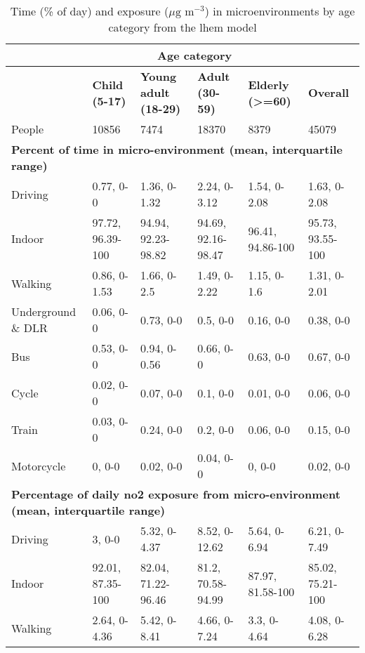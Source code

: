 \thispagestyle{empty}
\begin{landscape}

\begin{table}[H]
\caption{Time (\% of day) and exposure ($\mu \text{g m}^{-3}$) in microenvironments by age category from the \gls{lhem} model}
\centering
    \begin{tabular}{ | p{3.5cm} | p{3.3cm} | p{3.9cm} | p{3.3cm} | p{3.1cm} | p{3.1cm} |}
    \hline 
     & \multicolumn{4}{|c|}{\bfseries{Age category}} & \\ \hline
     & \bfseries{Child} (5-17) & \bfseries{Young adult} (18-29) & \bfseries{Adult (30-59)} & \bfseries{Elderly (\textgreater=60)} & \bfseries{Overall} \\ \hline
     People & 10856 & 7474 & 18370 & 8379 & 45079 \\ \hline
     \multicolumn{6}{|l|}{\bfseries{Percent of time in micro-environment (mean, interquartile range)}} \\ \hline
     Driving & 0.77, 0-0 & 1.36, 0-1.32 & 2.24, 0-3.12 & 1.54, 0-2.08 & 1.63, 0-2.08 \\ \hline
     Indoor & 97.72, 96.39-100 & 94.94, 92.23-98.82 & 94.69, 92.16-98.47 & 96.41, 94.86-100 & 95.73, 93.55-100 \\ \hline
     Walking & 0.86, 0-1.53 & 1.66, 0-2.5 & 1.49, 0-2.22 & 1.15, 0-1.6 & 1.31, 0-2.01 \\ \hline
     Underground \& DLR & 0.06, 0-0 & 0.73, 0-0 & 0.5, 0-0 & 0.16, 0-0 & 0.38, 0-0 \\ \hline
     Bus & 0.53, 0-0 & 0.94, 0-0.56 & 0.66, 0-0 & 0.63, 0-0 & 0.67, 0-0 \\ \hline
     Cycle & 0.02, 0-0 & 0.07, 0-0 & 0.1, 0-0 & 0.01, 0-0 & 0.06, 0-0 \\ \hline
     Train & 0.03, 0-0 & 0.24, 0-0 & 0.2, 0-0 & 0.06, 0-0 & 0.15, 0-0 \\ \hline
     Motorcycle & 0, 0-0 & 0.02, 0-0 & 0.04, 0-0 & 0, 0-0 & 0.02, 0-0 \\ \hline
     \multicolumn{6}{|l|}{\bfseries{Percentage of daily \gls{no2} exposure from micro-environment (mean, interquartile range)}} \\ \hline
     Driving & 3, 0-0 & 5.32, 0-4.37 & 8.52, 0-12.62 & 5.64, 0-6.94 & 6.21, 0-7.49 \\ \hline
     Indoor & 92.01, 87.35-100 & 82.04, 71.22-96.46 & 81.2, 70.58-94.99 & 87.97, 81.58-100 & 85.02, 75.21-100 \\ \hline
     Walking & 2.64, 0-4.36 & 5.42, 0-8.41 & 4.66, 0-7.24 & 3.3, 0-4.64 & 4.08, 0-6.28 \\ \hline

\end{tabular}
\end{table}
\end{landscape}
